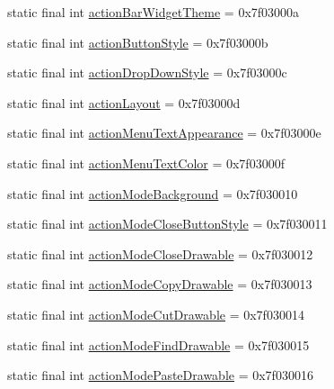 \begin{DoxyCompactItemize}
\item 
static final int \mbox{\hyperlink{classandroid_1_1support_1_1design_1_1_r_1_1attr_af0baa7827e6e80093848731140dc46b6}{action\+Bar\+Widget\+Theme}} = 0x7f03000a
\item 
static final int \mbox{\hyperlink{classandroid_1_1support_1_1design_1_1_r_1_1attr_ab12d475fd7924195e1673ccc3d20e441}{action\+Button\+Style}} = 0x7f03000b
\item 
static final int \mbox{\hyperlink{classandroid_1_1support_1_1design_1_1_r_1_1attr_a6e485f83950c6df7a7fa7b58b7ce60f1}{action\+Drop\+Down\+Style}} = 0x7f03000c
\item 
static final int \mbox{\hyperlink{classandroid_1_1support_1_1design_1_1_r_1_1attr_ad538703779b49b42e926051d5937eb0f}{action\+Layout}} = 0x7f03000d
\item 
static final int \mbox{\hyperlink{classandroid_1_1support_1_1design_1_1_r_1_1attr_a18a474dd4d75964fd29507f66ba20918}{action\+Menu\+Text\+Appearance}} = 0x7f03000e
\item 
static final int \mbox{\hyperlink{classandroid_1_1support_1_1design_1_1_r_1_1attr_a38bb816c17a2416113a223c4d476c7e5}{action\+Menu\+Text\+Color}} = 0x7f03000f
\item 
static final int \mbox{\hyperlink{classandroid_1_1support_1_1design_1_1_r_1_1attr_abc52d011e78f0f7cd31d084707c826fc}{action\+Mode\+Background}} = 0x7f030010
\item 
static final int \mbox{\hyperlink{classandroid_1_1support_1_1design_1_1_r_1_1attr_a389cd8e4c024d3acf65d8b5a3ccec912}{action\+Mode\+Close\+Button\+Style}} = 0x7f030011
\item 
static final int \mbox{\hyperlink{classandroid_1_1support_1_1design_1_1_r_1_1attr_a539705d65d41d03956688af3b083a80c}{action\+Mode\+Close\+Drawable}} = 0x7f030012
\item 
static final int \mbox{\hyperlink{classandroid_1_1support_1_1design_1_1_r_1_1attr_a9709f5fbcd7c014134e7440ba577ad29}{action\+Mode\+Copy\+Drawable}} = 0x7f030013
\item 
static final int \mbox{\hyperlink{classandroid_1_1support_1_1design_1_1_r_1_1attr_abdef737ac2e0d89e53de9d49ec74488f}{action\+Mode\+Cut\+Drawable}} = 0x7f030014
\item 
static final int \mbox{\hyperlink{classandroid_1_1support_1_1design_1_1_r_1_1attr_a75e6e720c7d37b501bb3b16d326ec282}{action\+Mode\+Find\+Drawable}} = 0x7f030015
\item 
static final int \mbox{\hyperlink{classandroid_1_1support_1_1design_1_1_r_1_1attr_afecf65fdc5c7b1990b9100f5078307a0}{action\+Mode\+Paste\+Drawable}} = 0x7f030016

\end{DoxyCompactItemize}
